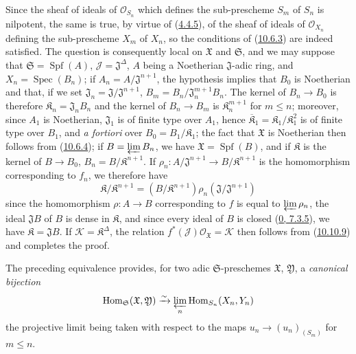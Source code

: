 Since the sheaf of ideals of $\mathscr{O}_{S_n}$ which defines the
sub-prescheme $S_m$ of $S_n$ is nilpotent, the same is true, by virtue of
(\hyperref[I.4.4.5]{4.4.5}), of the sheaf of ideals of
$\mathscr{O}_{X_n}$ defining the sub-prescheme $X_m$ of $X_n$, so the
conditions of (\hyperref[I.10.6.3]{10.6.3}) are indeed satisfied. The
question is consequently local on $\mathfrak{X}$ and $\mathfrak{S}$, and we
may suppose that $\mathfrak{S}=\operatorname{Spf}(A)$,
$\mathscr{J}=\mathfrak{J}^\Delta$, $A$ being a Noetherian
$\mathfrak{J}$-adic ring, and $X_n=\operatorname{Spec}(B_n)$; if
$A_n=A/\mathfrak{J}^{n+1}$, the hypothesis implies that $B_0$ is Noetherian
and that, if we set $\mathfrak{J}_n=\mathfrak{J}/\mathfrak{J}^{n+1}$,
$B_m=B_n/\mathfrak{J}_n^{m+1}B_n$. The kernel of $B_n\to B_0$ is therefore
$\mathfrak{K}_n=\mathfrak{J}_nB_n$ and the kernel of $B_n\to B_m$ is
$\mathfrak{K}_n^{m+1}$ for $m\leq n$; moreover, since $A_1$ is
Noetherian, $\mathfrak{J}_1$ is of finite type over $A_1$, hence
$\overline{\mathfrak{K}}_1=\mathfrak{K}_1/\mathfrak{K}_1^2$ is of finite type
over $B_1$, and \emph{a fortiori} over
$B_0=B_1/\mathfrak{K}_1$; the fact that $\mathfrak{X}$ is Noetherian
then follows from (\hyperref[I.10.6.4]{10.6.4}); if
$B=\varprojlim B_n$, we have $\mathfrak{X}=\operatorname{Spf}(B)$, and if
$\mathfrak{K}$ is the kernel of $B\to B_0$,
$B_n=B/\mathfrak{K}^{n+1}$. If
$\rho_n:A/\mathfrak{J}^{n+1}\to B/\mathfrak{K}^{n+1}$ is the homomorphism
corresponding to $f_n$, we therefore have
\[
  \mathfrak{K}/\mathfrak{K}^{n+1}
  =(B/\mathfrak{K}^{n+1})\rho_n(\mathfrak{J}/\mathfrak{J}^{n+1})
\]
since the homomorphism $\rho:A\to B$ corresponding to $f$ is equal to
$\varprojlim\rho_n$, the ideal $\mathfrak{J}B$ of $B$ is dense in
$\mathfrak{K}$, and since every ideal of $B$ is closed
(\hyperref[0.7.3.5]{0, 7.3.5}), we have $\mathfrak{K}=\mathfrak{J}B$. If
$\mathscr{K}=\mathfrak{K}^\Delta$, the relation
$f^*(\mathscr{J})\mathscr{O}_{\mathfrak{X}}=\mathscr{K}$ then follows from
(\hyperref[I.10.10.9]{10.10.9}) and completes the proof.

\begin{env}[10.12.3.2]
\label{I.10.12.3.2}
The preceding equivalence provides, for two adic $\mathfrak{S}$-preschemes
$\mathfrak{X}$, $\mathfrak{Y}$, a \emph{canonical bijection}
\[
  \operatorname{Hom}_{\mathfrak{S}}(\mathfrak{X},\mathfrak{Y})
  \xrightarrow{\sim}
  \varprojlim_n\operatorname{Hom}_{S_n}(X_n,Y_n)
\]
the projective limit being taken with respect to the maps
$u_n\to(u_n)_{(S_m)}$ for $m\leq n$.
\end{env}

